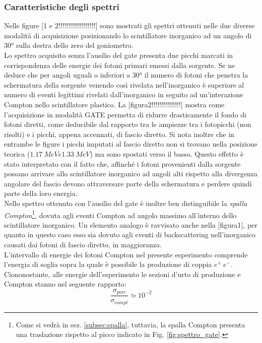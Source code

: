 \documentclass[8pt]{extarticle}
\begin{document}
\subsubsection{Caratteristiche degli spettri}
Nelle figure [1 e 2!!!!!!!!!!!!!!!!!!!] sono mostrati gli spettri ottenuti nelle due diverse modalità di acquisizione posizionando lo scintillatore inorganico ad un angolo di 30° sulla destra dello zero del goniometro. \\
Lo spettro acquisito senza l'ausilio del gate presenta due picchi marcati in corrispondenza delle energie dei fotoni primari emessi dalla sorgente. Se ne deduce che per angoli uguali o inferiori a 30° il numero di fotoni che penetra la schermatura della sorgente venendo così rivelata nell'inorganico è superiore al numero di eventi legittimi rivelati dall'inorganico in seguito ad un'interazione Compton nello scintillatore plastico.
La [figura2!!!!!!!!!!!!!!!] mostra come l'acquisizione in modalità GATE permetta di ridurre drasticamente il fondo di fotoni diretti, come deducibile dal rapporto tra le ampiezze tra i fotopicchi (non risolti) e i picchi, appena accennati, di fascio diretto. Si nota inoltre che in entrambe le figure i picchi imputati al fascio diretto non si trovano nella posizione teorica ($1.17 \ MeV e 1.33 \ MeV$) ma sono spostati verso il basso. Questo effetto è stato interpretato con il fatto che, affinché i fotoni provenienti dalla sorgente possano arrivare allo scintillatore inorganico ad angoli alti rispetto alla divergenza angolare del fascio devono attraversare parte della schermatura e perdere quindi parte della loro energia. \\
Nello spettro ottenuto con l'ausilio del gate è inoltre ben distinguibile la \textit{spalla Compton}\footnote{Come si vedrà in sez. \ref{subsec:spalla}, tuttavia, la spalla Compton presenta una traslazione rispetto al picco indicato in Fig. \ref{fig:spettro_gate}.}, dovuta agli eventi Compton ad angolo massimo all'interno dello scintillatore inorganico. Un elemento analogo è ravvisato anche nella [figura1], per quanto in questo caso esso sia dovuto agli eventi di backscattering nell'inorganico causati dai fotoni di fascio diretto, in maggioranza.\\
L'intervallo di energie dei fotoni Compton nel presente esperimento comprende l'energia di soglia sopra la quale è possibile la produzione di coppia $e^+\ e^-$. Ciononostante, alle energie dell'esperimento le sezioni d'urto di produzione e Compton stanno nel seguente rapporto:
\begin{equation}
\frac{\sigma_{pair}}{\sigma_{compt}}\simeq 10^{-2}
\end{equation}
\end{document}
